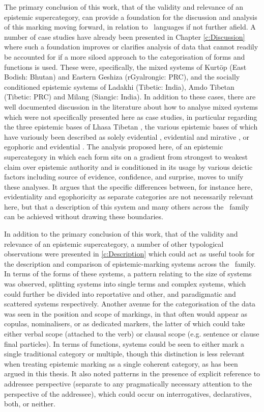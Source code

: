 The primary conclusion of this work, that of the validity and relevance of an epistemic supercategory, can provide a foundation for the discussion and analysis of this marking moving forward, in relation to \lfam\ languages if not further afield. A number of case studies have already been presented in Chapter \ref{c:Discussion} where such a foundation improves or clarifies analysis of data that cannot readily be accounted for if a more siloed approach to the categorisation of forms and functions is used. These were, specifically, the mixed systems of Kurtöp (East Bodish: Bhutan) and Eastern Geshiza (rGyalrongic: PRC), and the socially conditioned epistemic systems of Ladakhi (Tibetic: India), Amdo Tibetan (Tibetic: PRC) and Milang (Siangic: India). In addition to these cases, there are well documented discussion in the literature about how to analyse mixed systems which were not specifically presented here as case studies, in particular regarding the three epistemic bases of Lhasa Tibetan \cite{DeLancey2017Tibetan}, the various epistemic bases of which have variously been described as solely evidential \cite{Gawne2017}, evidential and mirative \cites{DeLanceyMirativity1997}{DeLancey2012}, or egophoric and evidential \cites{Tournadre1992}{Widmer2017}. The analysis proposed here, of an epistemic supercategory in which each form sits on a gradient from strongest to weakest claim over epistemic authority and is conditioned in its usage by various deictic factors including source of evidence, confidence, and surprise, moves to unify these analyses. It argues that the specific differences between, for instance here, evidentiality and egophoricity as separate categories are not necessarily relevant here, but that a description of this system and many others across the \lfam\ family can be achieved without drawing these boundaries.

In addition to the primary conclusion of this work, that of the validity and relevance of an epistemic supercategory, a number of other typological observations were presented in \ref{c:Description} which could act as useful tools for the description and comparison of epistemic-marking systems across the \lfam\ family. In terms of the forms of these systems, a pattern relating to the size of systems was observed, splitting systems into single terms and complex systems, which could further be divided into reportative and other, and paradigmatic and scattered systems respectively. Another avenue for the categorisation of the data was seen in the position and scope of markings, in that often would appear as copulas, nominalisers, or as dedicated markers, the latter of which could take either verbal scope (attached to the verb) or clausal scope (e.g. sentence or clause final particles). In terms of functions, systems could be seen to either mark a single traditional category or multiple, though this distinction is less relevant when treating epistemic marking as a single coherent category, as has been argued in this thesis. It also noted patterns in the presence of explicit reference to addressee perspective (separate to any pragmatically necessary attention to the perspective of the addressee), which could occur on interrogatives, declaratives, both, or neither. 

